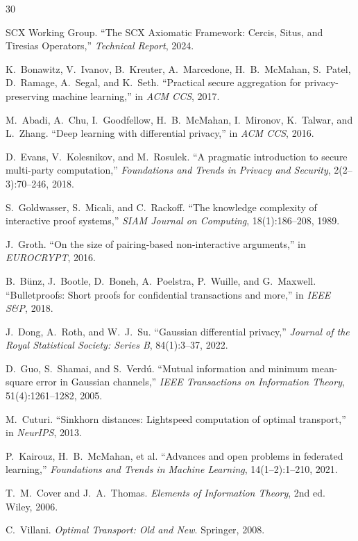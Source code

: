 \documentclass[12pt,a4paper]{article}
\begin{document}

\begin{thebibliography}{30}

SCX Working Group.
\newblock ``The SCX Axiomatic Framework: Cercis, Situs, and Tiresias
Operators,''
\newblock \emph{Technical Report}, 2024.

K.~Bonawitz, V.~Ivanov, B.~Kreuter, A.~Marcedone, H.~B.~McMahan, S.~Patel,
D.~Ramage, A.~Segal, and K.~Seth.
\newblock ``Practical secure aggregation for privacy-preserving machine
learning,''
\newblock in \emph{ACM CCS}, 2017.

M.~Abadi, A.~Chu, I.~Goodfellow, H.~B.~McMahan, I.~Mironov, K.~Talwar, and
L.~Zhang.
\newblock ``Deep learning with differential privacy,''
\newblock in \emph{ACM CCS}, 2016.

D.~Evans, V.~Kolesnikov, and M.~Rosulek.
\newblock ``A pragmatic introduction to secure multi-party computation,''
\newblock \emph{Foundations and Trends in Privacy and Security},
2(2--3):70--246, 2018.

S.~Goldwasser, S.~Micali, and C.~Rackoff.
\newblock ``The knowledge complexity of interactive proof systems,''
\newblock \emph{SIAM Journal on Computing}, 18(1):186--208, 1989.

J.~Groth.
\newblock ``On the size of pairing-based non-interactive arguments,''
\newblock in \emph{EUROCRYPT}, 2016.

B.~B\"unz, J.~Bootle, D.~Boneh, A.~Poelstra, P.~Wuille, and G.~Maxwell.
\newblock ``Bulletproofs: Short proofs for confidential transactions and
more,''
\newblock in \emph{IEEE S\&P}, 2018.

J.~Dong, A.~Roth, and W.~J.~Su.
\newblock ``Gaussian differential privacy,''
\newblock \emph{Journal of the Royal Statistical Society: Series B},
84(1):3--37, 2022.

D.~Guo, S.~Shamai, and S.~Verd\'u.
\newblock ``Mutual information and minimum mean-square error in Gaussian
channels,''
\newblock \emph{IEEE Transactions on Information Theory}, 51(4):1261--1282,
2005.

M.~Cuturi.
\newblock ``Sinkhorn distances: Lightspeed computation of optimal transport,''
\newblock in \emph{NeurIPS}, 2013.

P.~Kairouz, H.~B.~McMahan, et al.
\newblock ``Advances and open problems in federated learning,''
\newblock \emph{Foundations and Trends in Machine Learning},
14(1--2):1--210, 2021.

T.~M.~Cover and J.~A.~Thomas.
\newblock \emph{Elements of Information Theory}, 2nd ed.
\newblock Wiley, 2006.

C.~Villani.
\newblock \emph{Optimal Transport: Old and New}.
\newblock Springer, 2008.

\end{thebibliography}
\end{document}
